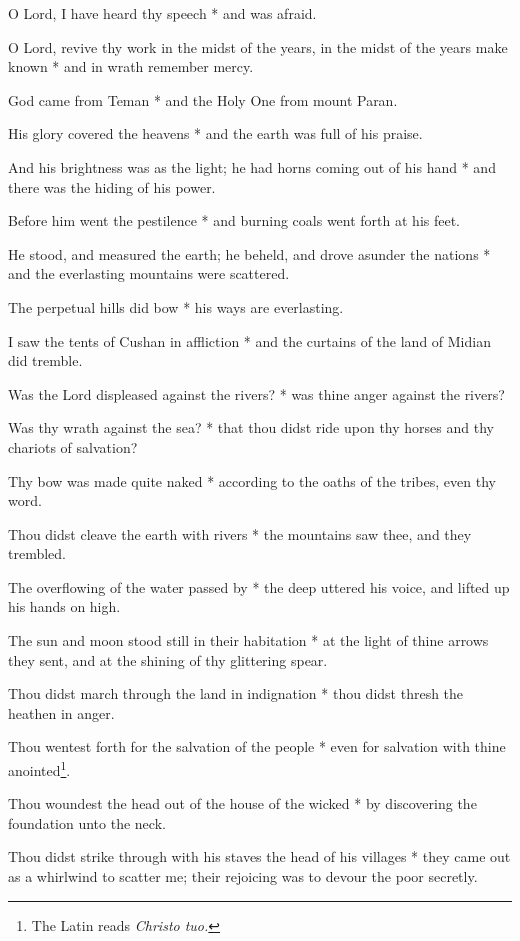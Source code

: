 O Lord, I have heard thy speech * and was afraid.

O Lord, revive thy work in the midst of the years, in the midst of the years make known * and in wrath remember mercy.

God came from Teman * and the Holy One from mount Paran.

His glory covered the heavens * and the earth was full of his praise.

And his brightness was as the light; he had horns coming out of his hand * and there was the hiding of his power.

Before him went the pestilence * and burning coals went forth at his feet.

He stood, and measured the earth; he beheld, and drove asunder the nations * and the everlasting mountains were scattered.

The perpetual hills did bow * his ways are everlasting.

I saw the tents of Cushan in affliction * and the curtains of the land of Midian did tremble.

Was the Lord displeased against the rivers? * was thine anger against the rivers?

Was thy wrath against the sea? * that thou didst ride upon thy horses and thy chariots of salvation?

Thy bow was made quite naked * according to the oaths of the tribes, even thy word.

Thou didst cleave the earth with rivers * the mountains saw thee, and they trembled.

The overflowing of the water passed by * the deep uttered his voice, and lifted up his hands on high.

The sun and moon stood still in their habitation * at the light of thine arrows they sent, and at the shining of thy glittering spear.

Thou didst march through the land in indignation * thou didst thresh the heathen in anger.

Thou wentest forth for the salvation of the people * even for salvation with thine anointed\footnote{The Latin reads \textit{Christo tuo.}}.

Thou woundest the head out of the house of the wicked * by discovering the foundation unto the neck.

Thou didst strike through with his staves the head of his villages * they came out as a whirlwind to scatter me; their rejoicing was to devour the poor secretly.

